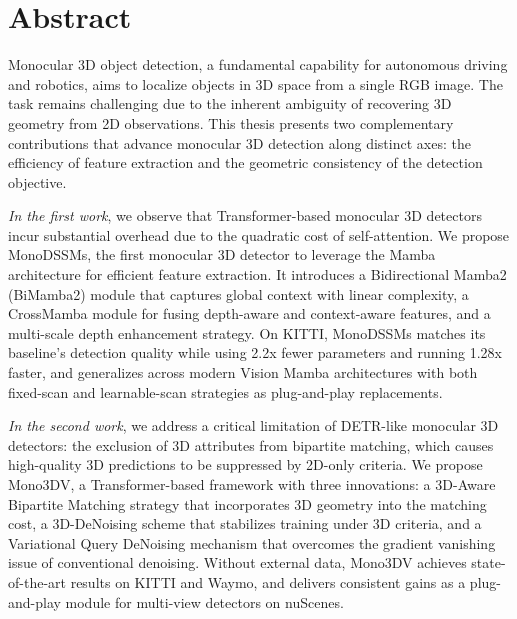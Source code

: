 \chapter*{Abstract}
Monocular 3D object detection, a fundamental capability for autonomous driving and robotics, aims to localize objects in 3D space from a single RGB image. The task remains challenging due to the inherent ambiguity of recovering 3D geometry from 2D observations. This thesis presents two complementary contributions that advance monocular 3D detection along distinct axes: the efficiency of feature extraction and the geometric consistency of the detection objective.

\textit{In the first work}, we observe that Transformer-based monocular 3D detectors incur substantial overhead due to the quadratic cost of self-attention. We propose MonoDSSMs, the first monocular 3D detector to leverage the Mamba architecture for efficient feature extraction. It introduces a Bidirectional Mamba2 (BiMamba2) module that captures global context with linear complexity, a CrossMamba module for fusing depth-aware and context-aware features, and a multi-scale depth enhancement strategy. On KITTI, MonoDSSMs matches its baseline's detection quality while using 2.2x fewer parameters and running 1.28x faster, and generalizes across modern Vision Mamba architectures with both fixed-scan and learnable-scan strategies as plug-and-play replacements.

\textit{In the second work}, we address a critical limitation of DETR-like monocular 3D detectors: the exclusion of 3D attributes from bipartite matching, which causes high-quality 3D predictions to be suppressed by 2D-only criteria. We propose Mono3DV, a Transformer-based framework with three innovations: a 3D-Aware Bipartite Matching strategy that incorporates 3D geometry into the matching cost, a 3D-DeNoising scheme that stabilizes training under 3D criteria, and a Variational Query DeNoising mechanism that overcomes the gradient vanishing issue of conventional denoising. Without external data, Mono3DV achieves state-of-the-art results on KITTI and Waymo, and delivers consistent gains as a plug-and-play module for multi-view detectors on nuScenes.